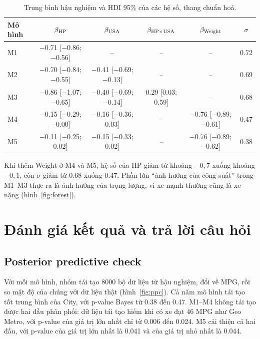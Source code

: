 \documentclass[12pt,a4paper]{report}
\begin{document}
\begin{table}[tp]
  \centering
  \small
  \caption{Trung bình hậu nghiệm và HDI 95\% của các hệ số, thang chuẩn hoá.}
  \label{tab:posterior}
  \begin{tabular}{lccccc}
    \toprule
    Mô hình & $\beta_{\mathrm{HP}}$ & $\beta_{\mathrm{USA}}$ & $\beta_{\mathrm{HP} \times \mathrm{USA}}$ & $\beta_{\mathrm{Weight}}$ & $\sigma$ \\
    \midrule
    M1 & \num{-0.71} [\num{-0.86}; \num{-0.56}] & -- & -- & -- & \num{0.72} \\
    M2 & \num{-0.70} [\num{-0.84}; \num{-0.55}] & \num{-0.41} [\num{-0.69}; \num{-0.13}] & -- & -- & \num{0.69} \\
    M3 & \num{-0.86} [\num{-1.07}; \num{-0.65}] & \num{-0.40} [\num{-0.69}; \num{-0.14}] & \num{0.29} [\num{0.03}; \num{0.59}] & -- & \num{0.68} \\
    M4 & \num{-0.15} [\num{-0.29}; \num{-0.00}] & \num{-0.16} [\num{-0.36}; \num{0.03}] & -- & \num{-0.76} [\num{-0.89}; \num{-0.61}] & \num{0.47} \\
    M5 & \num{-0.11} [\num{-0.25}; \num{0.02}] & \num{-0.15} [\num{-0.33}; \num{0.02}] & -- & \num{-0.76} [\num{-0.89}; \num{-0.62}] & \num{0.38} \\
    \bottomrule
  \end{tabular}
\end{table}

Khi thêm Weight ở M4 và M5, hệ số của HP giảm từ khoảng $-0{,}7$ xuống
khoảng $-0{,}1$, còn $\sigma$ giảm từ \num{0.68} xuống \num{0.47}. Phần lớn
``ảnh hưởng của công suất'' trong M1--M3 thực ra là ảnh hưởng của trọng lượng,
vì xe mạnh thường cũng là xe nặng (hình~\ref{fig:forest}).


\chapter{Đánh giá kết quả và trả lời câu hỏi}
\label{sec:evaluation}

\section{Posterior predictive check}

Với mỗi mô hình, nhóm tái tạo \num{8000} bộ dữ liệu từ hậu nghiệm, đổi về MPG,
rồi so mật độ của chúng với dữ liệu thật (hình~\ref{fig:ppc}). Cả năm mô hình tái
tạo tốt trung bình của City, với p-value Bayes từ \num{0.38} đến \num{0.47}.
M1--M4 không tái tạo được hai đầu phân phối: dữ liệu tái tạo hiếm khi có xe đạt
46 MPG như Geo Metro, với p-value của giá trị lớn nhất chỉ từ \num{0.006} đến
\num{0.024}. M5 cải thiện cả hai đầu, với p-value của giá trị lớn nhất là
\num{0.041} và của giá trị nhỏ nhất là \num{0.044}.
\end{document}
